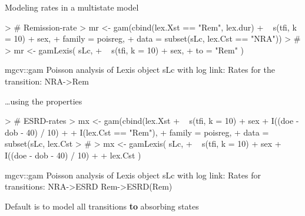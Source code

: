 \begin{frame}[fragile]{Modeling rates in a multistate model}
\begin{Schunk}
\begin{Sinput}
> # Remission-rate
> mr <- gam(cbind(lex.Xst == "Rem", lex.dur)
+           ~ s(tfi, k = 10) + sex,
+           family = poisreg,
+           data = subset(sLc, lex.Cst == "NRA"))
> #
> mr <- gamLexis( sLc,
+                 ~ s(tfi, k = 10) + sex,
+                 to = "Rem" )
\end{Sinput}
\begin{Soutput}
mgcv::gam Poisson analysis of Lexis object sLc with log link:
Rates for the transition:
NRA->Rem
\end{Soutput}
\end{Schunk}
\end{frame}

\begin{frame}[fragile]{\ldots using the  properties}
\vspace*{-1em}
\begin{Schunk}
\begin{Sinput}
> # ESRD-rates
> mx <- gam(cbind(lex.Xst %
+           ~ s(tfi, k = 10) + sex + I((doe - dob - 40) / 10) +
+                                    I(lex.Cst == "Rem"),
+           family = poisreg,
+             data = subset(sLc, lex.Cst %
> #
> mx <- gamLexis( sLc,
+                 ~ s(tfi, k = 10) + sex + I((doe - dob - 40) / 10) +
+                                          lex.Cst )
\end{Sinput}
\begin{Soutput}
mgcv::gam Poisson analysis of Lexis object sLc with log link:
Rates for transitions:
NRA->ESRD
Rem->ESRD(Rem)
\end{Soutput}
\end{Schunk}
\vspace*{-1em}
Default is to model all transitions \textbf{to} absorbing states
\end{frame}

